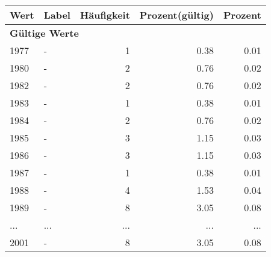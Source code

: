      \begin{longtable}{lXrrr}
     \toprule
     \textbf{Wert} & \textbf{Label} & \textbf{Häufigkeit} & \textbf{Prozent(gültig)} & \textbf{Prozent} \\
     \endhead
     \midrule
     \multicolumn{5}{l}{\textbf{Gültige Werte}}\\
        1977 & \multicolumn{1}{X}{-} & %
          \num{1} &
          \num[round-mode=places,round-precision=2]{0,38} &
          \num[round-mode=places,round-precision=2]{0,01} \\
        1980 & \multicolumn{1}{X}{-} & %
          \num{2} &
          \num[round-mode=places,round-precision=2]{0,76} &
          \num[round-mode=places,round-precision=2]{0,02} \\
        1982 & \multicolumn{1}{X}{-} & %
          \num{2} &
          \num[round-mode=places,round-precision=2]{0,76} &
          \num[round-mode=places,round-precision=2]{0,02} \\
        1983 & \multicolumn{1}{X}{-} & %
          \num{1} &
          \num[round-mode=places,round-precision=2]{0,38} &
          \num[round-mode=places,round-precision=2]{0,01} \\
        1984 & \multicolumn{1}{X}{-} & %
          \num{2} &
          \num[round-mode=places,round-precision=2]{0,76} &
          \num[round-mode=places,round-precision=2]{0,02} \\
        1985 & \multicolumn{1}{X}{-} & %
          \num{3} &
          \num[round-mode=places,round-precision=2]{1,15} &
          \num[round-mode=places,round-precision=2]{0,03} \\
        1986 & \multicolumn{1}{X}{-} & %
          \num{3} &
          \num[round-mode=places,round-precision=2]{1,15} &
          \num[round-mode=places,round-precision=2]{0,03} \\
        1987 & \multicolumn{1}{X}{-} & %
          \num{1} &
          \num[round-mode=places,round-precision=2]{0,38} &
          \num[round-mode=places,round-precision=2]{0,01} \\
        1988 & \multicolumn{1}{X}{-} & %
          \num{4} &
          \num[round-mode=places,round-precision=2]{1,53} &
          \num[round-mode=places,round-precision=2]{0,04} \\
        1989 & \multicolumn{1}{X}{-} & %
          \num{8} &
          \num[round-mode=places,round-precision=2]{3,05} &
          \num[round-mode=places,round-precision=2]{0,08} \\
       ... & ... & ... & ... & ... \\
        2001 & \multicolumn{1}{X}{-} & %
          \num{8} &
          \num[round-mode=places,round-precision=2]{3,05} &
          \num[round-mode=places,round-precision=2]{0,08} \\


\end{longtable}

